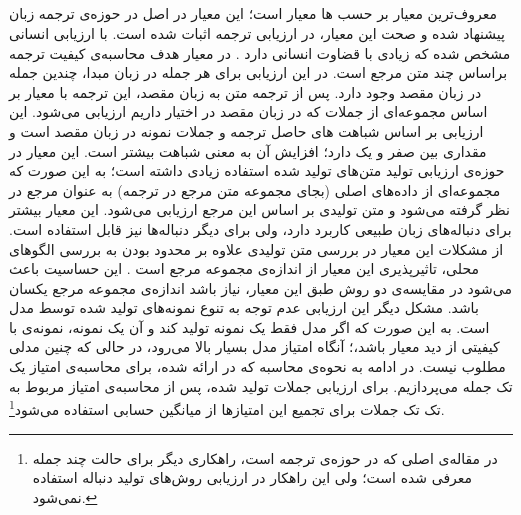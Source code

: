\subsection{}\label{Metric:BLEU}
معروف‌ترین معیار بر حسب 
\ngram ها
معیار
است؛ این معیار در اصل در حوزه‌ی  ترجمه زبان پیشنهاد شده و 
صحت این معیار، در ارزیابی ترجمه اثبات شده است. با ارزیابی انسانی مشخص شده که 
زیادی با قضاوت انسانی دارد
\cite{papineni2002bleu}.
در معیار 
هدف محاسبه‌ی کیفیت ترجمه براساس چند متن مرجع است. در این ارزیابی برای هر جمله در زبان مبدا، چندین جمله در زبان مقصد وجود دارد. پس از ترجمه متن به زبان مقصد، این ترجمه با معیار
بر اساس مجموعه‌ای از جملات که در زبان مقصد در اختیار داریم ارزیابی می‌شود. این ارزیابی بر اساس شباهت
\ngram های
حاصل ترجمه و جملات نمونه در زبان مقصد است و مقداری بین صفر و یک دارد؛ افزایش آن به معنی شباهت بیشتر است.
\newline
این معیار در حوزه‌ی ارزیابی تولید متن‌های تولید شده  استفاده زیادی داشته است؛ به این صورت که مجموعه‌ای از داده‌های اصلی (بجای مجموعه متن مرجع در ترجمه)
به عنوان مرجع در نظر گرفته می‌شود و متن تولیدی بر اساس این مرجع ارزیابی می‌شود.
این معیار بیشتر برای دنباله‌های زبان طبیعی کاربرد دارد، ولی برای دیگر دنباله‌ها نیز قابل استفاده است.
\newline
از مشکلات این معیار در بررسی متن تولیدی علاوه بر محدود بودن به بررسی الگوهای محلی، تاثیرپذیری این معیار از اندازه‌ی مجموعه مرجع است
\cite{papineni2002bleu}.
 این حساسیت باعث می‌شود در مقایسه‌ی دو روش طبق این معیار، نیاز باشد اندازه‌ی مجموعه مرجع یکسان باشد. مشکل دیگر این ارزیابی عدم توجه به تنوع نمونه‌های تولید شده توسط مدل است. به این صورت که اگر مدل فقط یک نمونه تولید کند و آن یک نمونه، نمونه‌ی با کیفیتی از دید معیار باشد،؛ آنگاه امتیاز مدل بسیار بالا می‌رود، در حالی که چنین مدلی مطلوب نیست.
\newline
در ادامه به نحوه‌ی محاسبه
که در
\cite{papineni2002bleu}
ارائه شده، برای محاسبه‌ی امتیاز یک تک جمله می‌پردازیم. برای ارزیابی جملات تولید شده، پس از محاسبه‌ی امتیاز
مربوط به تک تک جملات برای تجمیع این امتیاز‌ها از میانگین حسابی استفاده می‌شود\footnote{در مقاله‌ی اصلی  
	\cite{papineni2002bleu}
	که در حوزه‌ی ترجمه است، 	راهکاری دیگر برای  حالت چند جمله معرفی شده است؛ ولی این راهکار در ارزیابی‌ روش‌های تولید دنباله استفاده نمی‌شود.}.
